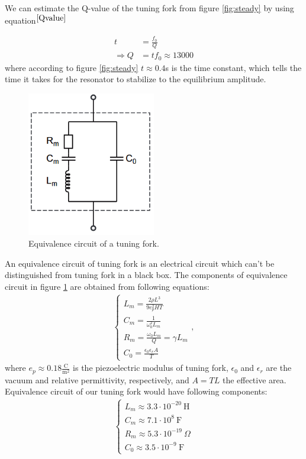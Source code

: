 \documentclass[12pt]{article}
\begin{document}
We can estimate the Q-value of the tuning fork from figure \ref{fig:steady} by using equation$^{\cite{Qvalue}}$

\begin{align*}
t &= \frac{f_0}{Q}\\
\Rightarrow Q &= tf_0 \approx 13000
\end{align*}
where according to figure \ref{fig:steady} $t \approx 0.4$s is the time constant, which tells the time it takes for the resonator to stabilize to the equilibrium amplitude.

\begin{figure}[!ht]
\centering
\includegraphics[width = 0.5\textwidth]{equivalence_circuit}
\caption{Equivalence circuit of a tuning fork.} \label{fig:equivalence_circuit}
\end{figure}

An equivalence circuit of tuning fork is an electrical circuit which can't be distinguished from tuning fork in a black box. The components of equivalence circuit in figure \ref{fig:equivalence_circuit} are obtained from following equations:
\begin{align} \label{eqn:equivalent}
\begin{cases}
L_m = \frac{2\rho L^3}{9e_p^2HT}\\
C_m = \frac{1}{\omega_0^2L_m}\\
R_m = \frac{\omega_0 L_m}{Q}=\gamma L_m\\
C_0 = \frac{\epsilon_0\epsilon_rA}{T}
\end{cases},
\end{align}
where $e_p \approx 0.18 \frac{\mathrm{C}}{\mathrm{m}^2}$ is the piezoelectric modulus of tuning fork, $\epsilon_0$ and $\epsilon_r$ are the vacuum and relative permittivity, respectively, and $A = TL$ the effective area. Equivalence circuit of our tuning fork would have following components:
\begin{align*}
\begin{cases}
L_m \approx 3.3\cdot10^{-20}~\mathrm{H}\\
C_m \approx 7.1\cdot10^8~\mathrm{F}\\
R_m \approx 5.3\cdot10^{-19}~\Omega\\
C_0 \approx 3.5\cdot10^{-9}~\mathrm{F}
\end{cases}
\end{align*}
\end{document}

